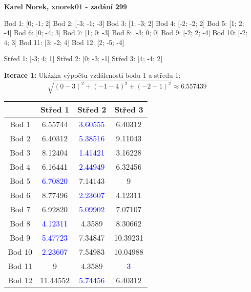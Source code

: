 \documentclass[12pt]{article}
\begin{document}
\flushleft
\textbf{Karel Norek, xnorek01 - zadání 299} \newline

\vspace{0.5cm}

Bod 1: [0; -1; 2]
Bod 2: [-3; -1; -3] 
Bod 3: [1; -3; 2] 
Bod 4: [-2; -2; 2] 
Bod 5: [1; 2; -4] \newline
Bod 6: [0; -4; 3]
Bod 7: [1; 0; -3]
Bod 8: [-3; 0; 0]
Bod 9: [-2; 2; -4]
Bod 10: [-2; 4; 3] \newline
Bod 11: [3; -2; 4]
Bod 12: [2; -5; -4] \newline

\vspace{0.1cm}

Střed 1: [-3; 4; 1]
Střed 2: [0; -3; -1]
Střed 3: [4; -4; 2]

\vspace{0.5cm}

\textbf{Iterace 1:} \newline
Ukázka výpočtu vzdálenosti bodu 1 a středu 1: \[\sqrt{(0-3)^2 + (-1-4)^2 + (-2-1)^2} \approx 6.557439\]
\begin{table}[!ht]
    \renewcommand{\arraystretch}{1.3}
    \centering
    \setlength{\tabcolsep}{20pt}
    \begin{tabular}{|c|c|c|c|}
    
    \hline
        & Střed 1 & Střed 2 & Střed 3 \\ \hline
        Bod 1 & 6.55744 & \textcolor{blue}{3.60555} & 6.40312 \\ \hline
        Bod 2 & 6.40312 & \textcolor{blue}{5.38516} & 9.11043 \\ \hline
        Bod 3 & 8.12404 & \textcolor{blue}{1.41421} & 3.16228\\ \hline
        Bod 4 & 6.16441 & \textcolor{blue}{2.44949} & 6.32456 \\ \hline
        Bod 5 & \textcolor{blue}{6.70820} & 7.14143 & 9 \\ \hline
        Bod 6 & 8.77496 & \textcolor{blue}{2.23607} & 4.12311 \\ \hline
        Bod 7 & 6.92820 & \textcolor{blue}{5.09902} & 7.07107 \\ \hline
        Bod 8 & \textcolor{blue}{4.12311} & 4.3589 & 8.30662\\ \hline
        Bod 9 & \textcolor{blue}{5.47723} & 7.34847 & 10.39231 \\ \hline
        Bod 10 & \textcolor{blue}{2.23607} & 7.54983 & 10.04988 \\ \hline
        Bod 11 & 9 & 4.3589 & \textcolor{blue}{3} \\ \hline
        Bod 12 & 11.44552 & \textcolor{blue}{5.74456} & 6.40312 \\
    \hline
    \end{tabular}
    \label{tab:iterace1}
\end{table}
\newline
{}
\end{document}
